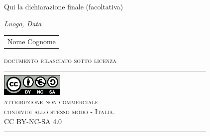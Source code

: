 \thispagestyle{empty}

\noindent Qui la dichiarazione finale (facoltativa)
\bigskip
 
\noindent\textit{Luogo, Data}

\smallskip

\begin{flushright}
    \begin{tabular}{m{5cm}}
        \\ \hline
        \centering Nome Cognome\\
    \end{tabular}
\end{flushright}





\vspace*{\fill}
\renewcommand{\baselinestretch}{1}

\begin{center}
 \footnotesize{
\textsc {documento rilasciato sotto licenza}}\\

 \begingroup
\noindent ---------------------------------------------------------------------------------------\\
 \includegraphics[width=3cm]{img/by_nc_sa_eu.png}   \\ 
 \footnotesize{
\textsc{attribuzione non commerciale\\
condividi allo stesso modo - Italia.\\
CC BY-NC-SA 4.0}\\
}
---------------------------------------------------------------------------------------\\

\end{center}
\endgroup